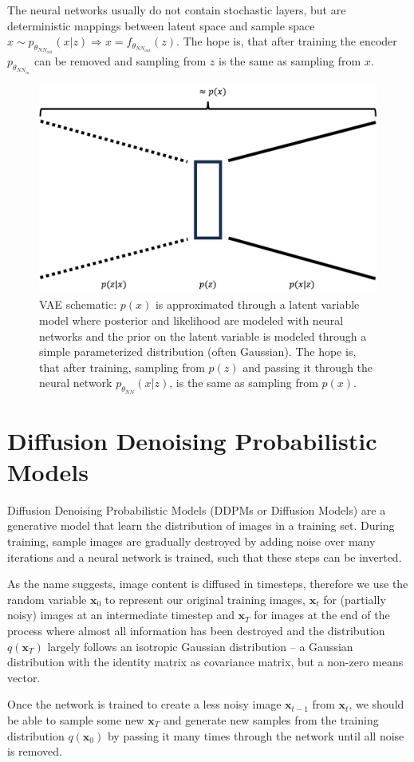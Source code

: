 The neural networks usually do not contain stochastic layers, but are deterministic mappings between latent space and sample space $x \sim p_{\theta_{NN_{out}}}(x|z) \Rightarrow x = f_{\theta_{NN_{out}}}(z)$. The hope is, that after training the encoder $p_{\theta_{NN_{in}}}$ can be removed and sampling from $z$ is the same as sampling from $x$.

\begin{figure}[h]
    \centering
    \includegraphics[width=.5\textwidth]{images/vae.png}
    \caption{VAE schematic: $p(x)$ is approximated through a latent variable model where posterior and likelihood are modeled with neural networks and the prior on the latent variable is modeled through a simple parameterized distribution (often Gaussian). The hope is, that after training, sampling from $p(z)$ and passing it through the neural network $p_{\theta_{NN}}(x|z)$, is the same as sampling from $p(x)$.}
    \label{fig:vae}
\end{figure}

\section{Diffusion Denoising Probabilistic Models}
Diffusion Denoising Probabilistic Models (DDPMs or Diffusion Models) are a generative model that learn the distribution of images in a training set. During training, sample images are gradually destroyed by adding noise over many iterations and a neural network is trained, such that these steps can be inverted.

As the name suggests, image content is diffused in timesteps, therefore we use the random variable $\bm{x}_0$ to represent our original training images, $\bm{x}_t$ for (partially noisy) images at an intermediate timestep and $\bm{x}_T$ for images at the end of the process where almost all information has been destroyed and the distribution $q(\bm{x}_T)$ largely follows an isotropic Gaussian distribution -- a Gaussian distribution with the identity matrix as covariance matrix, but a non-zero means vector.

Once the network is trained to create a less noisy image $\bm{x}_{t-1}$ from $\bm{x}_t$, we should be able to sample some new $\bm{x}_T$ and generate new samples from the training distribution $q(\bm{x}_0)$ by passing it many times through the network until all noise is removed.

